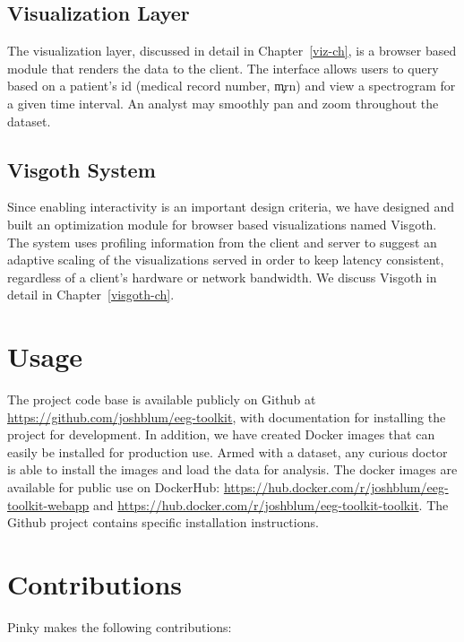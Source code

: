\subsection{Visualization Layer}

The visualization layer, discussed in detail in Chapter~\ref{viz-ch}, is a browser
based module that renders the data to the client. The interface allows users to
query based on a patient's id (medical record number, \c{mrn}) and view a spectrogram
for a given time interval. An analyst may smoothly pan and zoom throughout the dataset.

\subsection{Visgoth System}

Since enabling interactivity is an important design criteria, we have designed
and built an optimization module for browser based visualizations named
Visgoth. The system uses profiling information from the client and server to
suggest an adaptive scaling of the visualizations served in order to keep
latency consistent, regardless of a client's hardware or network bandwidth. We
discuss Visgoth in detail in Chapter~\ref{visgoth-ch}.

\section{Usage}

The project code base is available publicly on Github \cite{github} at
\url{https://github.com/joshblum/eeg-toolkit}, with documentation for
installing the project for development. In addition, we have created Docker
\cite{docker} images that can easily be installed for production use. Armed
with a dataset, any curious doctor is able to install the images and load the
data for analysis. The docker images are available for public use on DockerHub:
\url{https://hub.docker.com/r/joshblum/eeg-toolkit-webapp} and
\url{https://hub.docker.com/r/joshblum/eeg-toolkit-toolkit}. The Github project
contains specific installation instructions.

\section{Contributions}

Pinky makes the following contributions:

